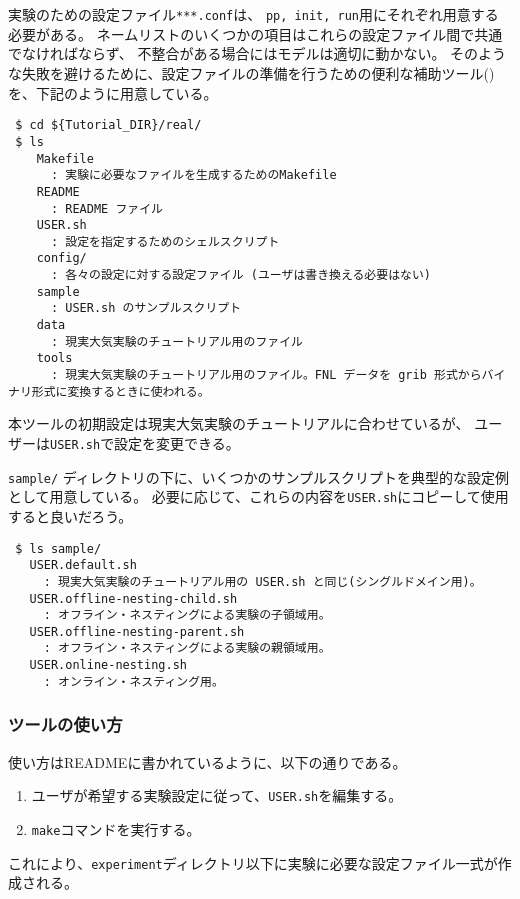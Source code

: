 \section{\SecMakeconfTool} \label{sec:basic_makeconf}

実験のための設定ファイル\verb|***.conf|は、
\verb|pp, init, run|用にそれぞれ用意する必要がある。
ネームリストのいくつかの項目はこれらの設定ファイル間で共通でなければならず、
不整合がある場合にはモデルは適切に動かない。
そのような失敗を避けるために、設定ファイルの準備を行うための便利な補助ツール(\makeconftool)を、下記のように用意している。
\begin{verbatim}
 $ cd ${Tutorial_DIR}/real/
 $ ls
    Makefile
      : 実験に必要なファイルを生成するためのMakefile
    README
      : README ファイル
    USER.sh
      : 設定を指定するためのシェルスクリプト
    config/
      : 各々の設定に対する設定ファイル (ユーザは書き換える必要はない)
    sample
      : USER.sh のサンプルスクリプト
    data
      : 現実大気実験のチュートリアル用のファイル
    tools
      : 現実大気実験のチュートリアル用のファイル。FNL データを grib 形式からバイナリ形式に変換するときに使われる。
\end{verbatim}
本ツールの初期設定は現実大気実験のチュートリアルに合わせているが、
ユーザーは\verb|USER.sh|で設定を変更できる。

\verb|sample/| ディレクトリの下に、いくつかのサンプルスクリプトを典型的な設定例として用意している。
必要に応じて、これらの内容を\verb|USER.sh|にコピーして使用すると良いだろう。
\begin{verbatim}
 $ ls sample/
   USER.default.sh
     : 現実大気実験のチュートリアル用の USER.sh と同じ(シングルドメイン用)。
   USER.offline-nesting-child.sh
     : オフライン・ネスティングによる実験の子領域用。
   USER.offline-nesting-parent.sh
     : オフライン・ネスティングによる実験の親領域用。
   USER.online-nesting.sh
     : オンライン・ネスティング用。
\end{verbatim}


\subsubsection{ツールの使い方}

使い方はREADMEに書かれているように、以下の通りである。
\begin{enumerate}
  \item ユーザが希望する実験設定に従って、\verb|USER.sh|を編集する。
  \item \verb|make|コマンドを実行する。
\end{enumerate}
これにより、\verb|experiment|ディレクトリ以下に実験に必要な設定ファイル一式が作成される。

